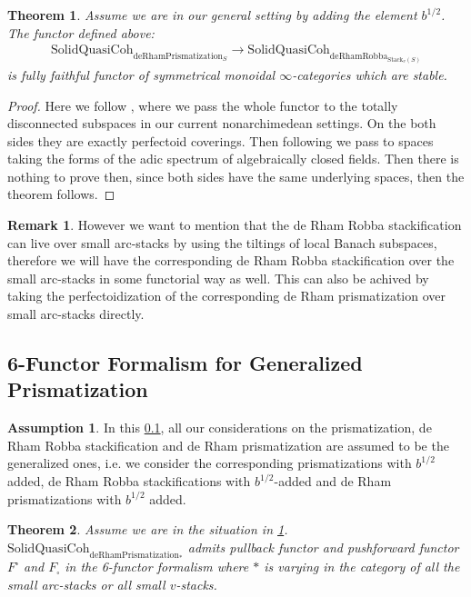 \documentclass[12pt]{article}
\newtheorem{theorem}{Theorem}
\theoremstyle{definition}
\newtheorem{remark}{Remark}
\newtheorem{assumption}{Assumption}
\begin{document}
\begin{theorem}
Assume we are in our general setting by adding the element $b^{1/2}$. The functor defined above:
\begin{align}
\mathrm{SolidQuasiCoh}_{\mathrm{deRhamPrismatization}_S}\longrightarrow \mathrm{SolidQuasiCoh}_{\mathrm{deRhamRobba}_{\mathrm{Stack}_v(S)}}
\end{align}
is fully faithful functor of symmetrical monoidal $\infty$-categories which are stable.
\end{theorem}

\begin{proof}
Here we follow \cite{1S5} \cite{1S6}, where we pass the whole functor to the totally disconnected subspaces in our current nonarchimedean settings. On the both sides they are exactly perfectoid coverings. Then following \cite{1S5} \cite{1S6} we pass to spaces taking the forms of the adic spectrum of algebraically closed fields. Then there is nothing to prove then, since both sides have the same underlying spaces, then the theorem follows.
\end{proof}

\begin{remark}
However we want to mention that the de Rham Robba stackification can live over small arc-stacks by using the tiltings of local Banach subspaces, therefore we will have the corresponding de Rham Robba stackification over the small arc-stacks in some functorial way as well. This can also be achived by taking the perfectoidization of the corresponding de Rham prismatization over small arc-stacks directly.
\end{remark}


\subsection{6-Functor Formalism for Generalized Prismatization}\label{section7.2}


\begin{assumption}\label{assumption2}
In this \cref{section7.2}, all our considerations on the prismatization, de Rham Robba stackification and de Rham prismatization are assumed to be the generalized ones, i.e. we consider the corresponding prismatizations with $b^{1/2}$ added, de Rham Robba stackifications with $b^{1/2}$-added and de Rham prismatizations with $b^{1/2}$ added.
\end{assumption}


\begin{theorem}
Assume we are in the situation in \cref{assumption2}. $\mathrm{SolidQuasiCoh}_{\mathrm{deRhamPrismatization}_*}$ admits pullback functor and pushforward functor $F^\square$ and $F_\square$ in the 6-functor formalism where $*$ is varying in the category of all the small arc-stacks or all small $v$-stacks.
\end{theorem}
\end{document}
